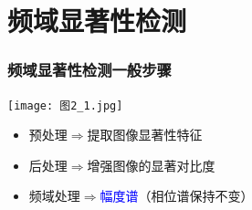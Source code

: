 \documentclass[notheorems,mathserif,table,compress]{beamer}  %
\begin{document}



\section{频域显著性检测}
\begin{frame}
  \frametitle{频域显著性检测一般步骤}
\begin{center}
\texttt{[image: 图2\_1.jpg]}%
\end{center}
  \begin{itemize}
  \item 预处理$\Longrightarrow$提取图像显著性特征
  \item 后处理$\Longrightarrow$增强图像的显著对比度
  \item 频域处理$\Longrightarrow$\textcolor{blue}{幅度谱}（相位谱保持不变）
  \end{itemize}

\end{frame}
\end{document}

